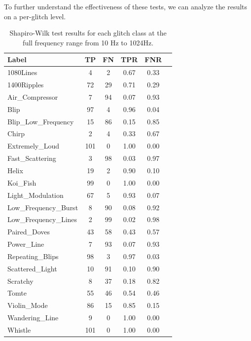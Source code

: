 \documentclass[12pt]{article}
\begin{document}
\medskip
\noindent To further understand the effectiveness of these tests, we can analyze the results on a per-glitch level.

\begin{table}[H]
  \centering
  \begin{tabular}{lccccc}
  \toprule
  Label & TP & FN & TPR & FNR \\
  \midrule
  1080Lines & 4 & 2 & 0.67 & 0.33 \\
  1400Ripples & 72 & 29 & 0.71 & 0.29 \\
  Air\_Compressor & 7 & 94 & 0.07 & 0.93 \\
  Blip & 97 & 4 & 0.96 & 0.04 \\
  Blip\_Low\_Frequency & 15 & 86 & 0.15 & 0.85 \\
  Chirp & 2 & 4 & 0.33 & 0.67 \\
  Extremely\_Loud & 101 & 0 & 1.00 & 0.00 \\
  Fast\_Scattering & 3 & 98 & 0.03 & 0.97 \\
  Helix & 19 & 2 & 0.90 & 0.10 \\
  Koi\_Fish & 99 & 0 & 1.00 & 0.00 \\
  Light\_Modulation & 67 & 5 & 0.93 & 0.07 \\
  Low\_Frequency\_Burst & 8 & 90 & 0.08 & 0.92 \\
  Low\_Frequency\_Lines & 2 & 99 & 0.02 & 0.98 \\
  Paired\_Doves & 43 & 58 & 0.43 & 0.57 \\
  Power\_Line & 7 & 93 & 0.07 & 0.93 \\
  Repeating\_Blips & 98 & 3 & 0.97 & 0.03 \\
  Scattered\_Light & 10 & 91 & 0.10 & 0.90 \\
  Scratchy & 8 & 37 & 0.18 & 0.82 \\
  Tomte & 55 & 46 & 0.54 & 0.46 \\
  Violin\_Mode & 86 & 15 & 0.85 & 0.15 \\
  Wandering\_Line & 9 & 0 & 1.00 & 0.00 \\
  Whistle & 101 & 0 & 1.00 & 0.00 \\
  \bottomrule
  \end{tabular}
  \caption{Shapiro-Wilk test results for each glitch class at the full frequency range from 10 Hz to 1024Hz.}
  \label{tab:shapiro_full_range_results}
\end{table}
\end{document}
